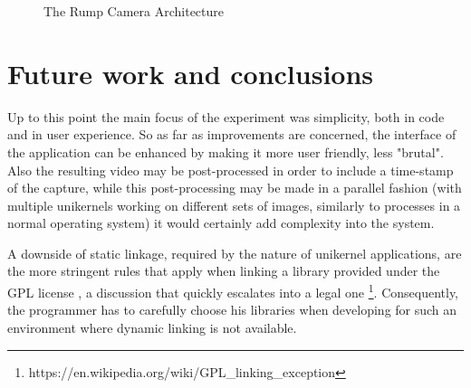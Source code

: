 \documentclass[10pt,a4paper,twoside]{article}
\begin{document}
\begin{figure}
  \centering
  \caption{The Rump Camera Architecture}
  \label{fig:archdiagram}
\end{figure}

\section{Future work and conclusions}

Up to this point the main focus of the experiment was simplicity, both in code and in user experience. So as far as improvements are concerned, the interface of the application can be enhanced by making it more user friendly, less "brutal". Also the resulting video may be post-processed in order to include a time-stamp of the capture,
while this post-processing may be made in a parallel fashion (with multiple unikernels working on different sets of images, similarly to processes in a normal operating system) it would certainly add complexity
into the system.

A downside of static linkage, required by the nature of unikernel applications, are the more stringent rules that apply when linking a library provided under the GPL license \cite{gpl}, a discussion that quickly escalates into a legal one \footnote{https://en.wikipedia.org/wiki/GPL\_linking\_exception}. Consequently, the programmer has to carefully choose his libraries when developing for such an environment where dynamic linking is not available.
\end{document}
